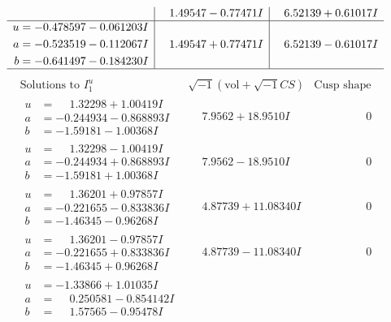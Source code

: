 \documentclass[1p]{elsarticle_modified}
\theoremstyle{definition}
\newcommand{\I}{\sqrt{-1}}
\begin{document}
$$\begin{array}{c|c|c}
 & \phantom{-}1.49547 - 0.77471 I & \phantom{-}6.52139 + 0.61017 I \\ \hline\begin{aligned}
u &= -0.478597 - 0.061203 I \\
a &= -0.523519 - 0.112067 I \\
b &= -0.641497 - 0.184230 I\end{aligned}
 & \phantom{-}1.49547 + 0.77471 I & \phantom{-}6.52139 - 0.61017 I\\
 \hline 
 \end{array}$$\newpage$$\begin{array}{c|c|c}  
\text{Solutions to }I^u_{1}& \I (\text{vol} + \sqrt{-1}CS) & \text{Cusp shape}\\
 \hline 
\begin{aligned}
u &= \phantom{-}1.32298 + 1.00419 I \\
a &= -0.244934 - 0.868893 I \\
b &= -1.59181 - 1.00368 I\end{aligned}
 & \phantom{-}7.9562 + 18.9510 I & \phantom{-0.000000 } 0 \\ \hline\begin{aligned}
u &= \phantom{-}1.32298 - 1.00419 I \\
a &= -0.244934 + 0.868893 I \\
b &= -1.59181 + 1.00368 I\end{aligned}
 & \phantom{-}7.9562 - 18.9510 I & \phantom{-0.000000 } 0 \\ \hline\begin{aligned}
u &= \phantom{-}1.36201 + 0.97857 I \\
a &= -0.221655 - 0.833836 I \\
b &= -1.46345 - 0.96268 I\end{aligned}
 & \phantom{-}4.87739 + 11.08340 I & \phantom{-0.000000 } 0 \\ \hline\begin{aligned}
u &= \phantom{-}1.36201 - 0.97857 I \\
a &= -0.221655 + 0.833836 I \\
b &= -1.46345 + 0.96268 I\end{aligned}
 & \phantom{-}4.87739 - 11.08340 I & \phantom{-0.000000 } 0 \\ \hline\begin{aligned}
u &= -1.33866 + 1.01035 I \\
a &= \phantom{-}0.250581 - 0.854142 I \\
b &= \phantom{-}1.57565 - 0.95478 I\end{aligned}

\end{array}$$
\end{document}
